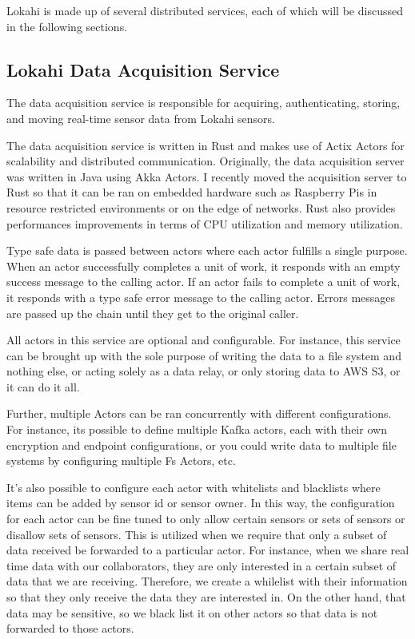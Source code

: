 Lokahi is made up of several distributed services, each of which will be discussed in the following sections.

\subsection{Lokahi Data Acquisition Service}\label{subsec:lokahi-data-acquisition-service}
The data acquisition service is responsible for acquiring, authenticating, storing, and moving real-time sensor data from Lokahi sensors.

The data acquisition service is written in Rust and makes use of Actix Actors for scalability and distributed communication. Originally, the data acquisition server was written in Java using Akka Actors. I recently moved the acquisition server to Rust so that it can be ran on embedded hardware such as Raspberry Pis in resource restricted environments or on the edge of networks. Rust also provides performances improvements in terms of CPU utilization and memory utilization.

Type safe data is passed between actors where each actor fulfills a single purpose. When an actor successfully completes a unit of work, it responds with an empty success message to the calling actor. If an actor fails to complete a unit of work, it responds with a type safe error message to the calling actor. Errors messages are passed up the chain until they get to the original caller.

All actors in this service are optional and configurable. For instance, this service can be brought up with the sole purpose of writing the data to a file system and nothing else, or acting  solely as a data relay, or only storing data to AWS S3, or it can do it all.

Further, multiple Actors can be ran concurrently with different configurations. For instance, its possible to define multiple Kafka actors, each with their own encryption and endpoint configurations, or you could write data to multiple file systems by configuring multiple Fs Actors, etc.

It's also possible to configure each actor with whitelists and blacklists where items can be added by sensor id or sensor owner. In this way, the configuration for each actor can be fine tuned to only allow certain sensors or sets of sensors or disallow sets of sensors. This is utilized when we require that only a subset of data received be forwarded to a particular actor. For instance, when we share real time data with our collaborators, they are only interested in a certain subset of data that we are receiving. Therefore, we create a whilelist with their information so that they only receive the data they are interested in. On the other hand, that data may be sensitive, so we black list it on other actors so that data is not forwarded to those actors.


